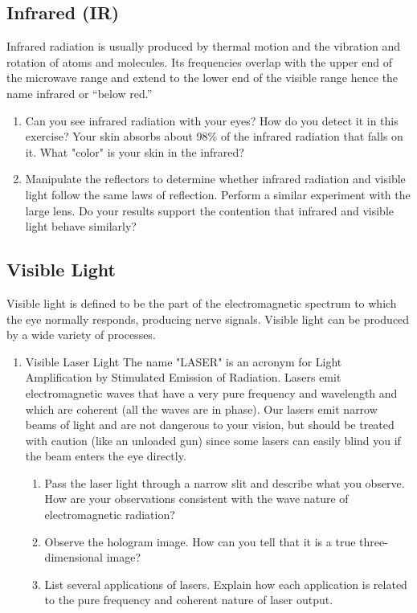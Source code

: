 \begin{multicols}{2}
\subsection{Infrared (IR)}
Infrared radiation is usually produced by thermal motion and the vibration and rotation of atoms and molecules.  Its frequencies overlap with the upper end of the microwave range and extend to the lower end of the visible range hence the name infrared or ``below red.''
\begin{enumerate}
	\item Can you see infrared radiation with your eyes?  How do you detect it in this exercise?  Your skin absorbs about 98\% of the infrared radiation that falls on it.  What "color" is your skin in the infrared?
	\item Manipulate the reflectors to determine whether infrared radiation and visible light follow the same laws of reflection.  Perform a similar experiment with the large lens.  Do your results support the contention that infrared and visible light behave similarly?
\end{enumerate}
	
\subsection{Visible Light} 
Visible light is defined to be the part of the electromagnetic spectrum to which the eye normally responds, producing nerve signals.  Visible light can be produced by a wide variety of processes.
\begin{enumerate}
	\item Visible Laser Light
	The name "LASER" is an acronym for Light Amplification by Stimulated Emission of Radiation.  Lasers emit electromagnetic waves that have a very pure frequency and wavelength and which are coherent (all the waves are in phase).  Our lasers emit narrow beams of light and are not dangerous to your vision, but should be treated with caution (like an unloaded gun) since some lasers can easily blind you if the beam enters the eye directly.
	\begin{enumerate}
		\item Pass the laser light through a narrow slit and describe what you observe.  How are your observations consistent with the wave nature of electromagnetic radiation?
		\item Observe the hologram image.  How can you tell that it is a true three-dimensional image?
		\item List several applications of lasers.  Explain how each application is related to the pure frequency and coherent nature of laser output.
	\end{enumerate}
	

\end{enumerate}
\end{multicols}
